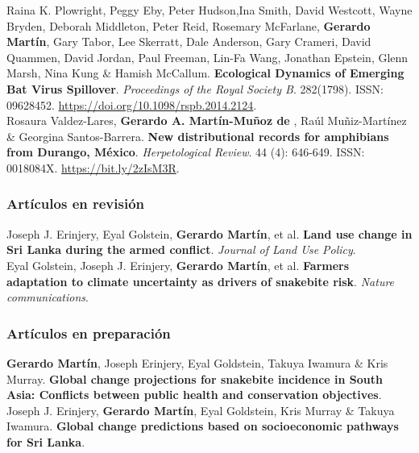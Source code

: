 \documentclass[11pt, letter]{article}
\newcommand{\years}[1]{\marginnote{\scriptsize #1}}
\begin{document}
\years{2015} Raina K. Plowright, Peggy Eby, Peter Hudson,Ina Smith, David Westcott, Wayne Bryden, Deborah Middleton, Peter Reid, Rosemary McFarlane, \textbf{Gerardo Mart\'in}, Gary Tabor, Lee Skerratt, Dale Anderson, Gary Crameri, David Quammen, David Jordan, Paul Freeman, Lin-Fa Wang, Jonathan Epstein, Glenn Marsh, Nina Kung \& Hamish McCallum. \textbf{Ecological Dynamics of Emerging Bat Virus Spillover}. \emph{Proceedings of the Royal Society B}.  282(1798). ISSN: 09628452. \url{https://doi.org/10.1098/rspb.2014.2124}.\\

\years{2013} Rosaura Valdez-Lares, \textbf{Gerardo A. Mart\'in-Mu\~noz de }, Ra\'ul Mu\~niz-Mart\'inez \& Georgina Santos-Barrera. \textbf{New distributional records for amphibians from Durango, M\'exico}. \emph{Herpetological Review}. 44 (4): 646-649. ISSN: 0018084X. \url{https://bit.ly/2zIsM3R}.\\

\subsubsection*{Art\'iculos en revisión}

\years{2022} Joseph J. Erinjery, Eyal Golstein, \textbf{Gerardo Mart\'in}, et al. \textbf{Land use change in Sri Lanka during the armed conflict}. \emph{Journal of Land Use Policy}. \\

\years{2022} Eyal Golstein, Joseph J. Erinjery, \textbf{Gerardo Mart\'in}, et al. \textbf{Farmers adaptation to climate uncertainty as drivers of snakebite risk}. \emph{Nature communications}.\\

\subsubsection*{Art\'iculos en preparaci\'on}

\years{2022}  \textbf{Gerardo Mart\'in}, Joseph Erinjery, Eyal Goldstein, Takuya Iwamura \& Kris Murray. \textbf{Global change projections for snakebite incidence in South Asia: Conflicts between public health and conservation objectives}.\\

\years{2022} 	Joseph J. Erinjery, \textbf{Gerardo Mart\'in}, Eyal Goldstein, Kris Murray \& Takuya Iwamura. \textbf{Global change predictions based on socioeconomic pathways for Sri Lanka}.\\
\end{document}
